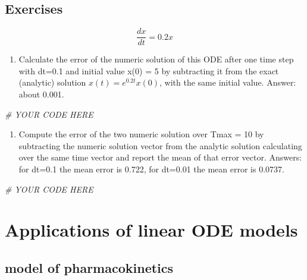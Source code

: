 \documentclass[
]{book}
\newenvironment{Shaded}{\begin{snugshade}}{\end{snugshade}}
\newcommand{\CommentTok}[1]{\textcolor[rgb]{0.56,0.35,0.01}{\textit{#1}}}
\providecommand{\tightlist}{%
  \setlength{\itemsep}{0pt}\setlength{\parskip}{0pt}}
\theoremstyle{definition}
\theoremstyle{definition}
\theoremstyle{definition}
\theoremstyle{remark}
\begin{document}
\hypertarget{exercises-18}{%
\subsection{Exercises}\label{exercises-18}}

\[
\frac{dx}{dt} =  0.2 x 
\]

\begin{enumerate}
\def\labelenumi{\arabic{enumi}.}
\tightlist
\item
  Calculate the error of the numeric solution of this ODE after one time step with dt=0.1 and initial value x(0) = 5 by subtracting it from the exact (analytic) solution \(x(t) = e^{0.2t}x(0)\), with the same initial value. Answer: about 0.001.
\end{enumerate}

\begin{Shaded}
\begin{Highlighting}[]
\CommentTok{\# YOUR CODE HERE}
\end{Highlighting}
\end{Shaded}

\begin{enumerate}
\def\labelenumi{\arabic{enumi}.}
\setcounter{enumi}{1}
\tightlist
\item
  Compute the error of the two numeric solution over Tmax = 10 by subtracting the numeric solution vector from the analytic solution calculating over the same time vector and report the mean of that error vector. Answers: for dt=0.1 the mean error is 0.722, for dt=0.01 the mean error is 0.0737.
\end{enumerate}

\begin{Shaded}
\begin{Highlighting}[]
\CommentTok{\# YOUR CODE HERE}
\end{Highlighting}
\end{Shaded}

\hypertarget{applications-of-linear-ode-models}{%
\section{Applications of linear ODE models}\label{applications-of-linear-ode-models}}

\label{sec:bio15}

\hypertarget{model-of-pharmacokinetics}{%
\subsection{model of pharmacokinetics}\label{model-of-pharmacokinetics}}
\end{document}
